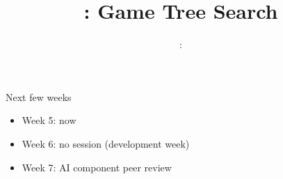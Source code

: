 \usepackage{../../beamerthemeFalmouthGamesAcademy}
\usepackage{multimedia}
\graphicspath{ {../../} }

\usepackage[T1]{fontenc}

\renewcommand{\pounds}{\text{\textsterling}}


\usepackage[normalem]{ulem}
\usepackage{wasysym}

\usepackage[noend]{algpseudocode}
\usepackage{pdfpages}

\usetikzlibrary{arrows,automata}




\title{\sessionnumber: Game Tree Search}
\subtitle{\modulecode: \moduletitle}

\frame{\titlepage} 

\begin{frame}{Next few weeks}
    \begin{itemize}
        \pause\item Week 5: now
        \pause\item Week 6: no session (development week)
        \pause\item Week 7: AI component peer review
    \end{itemize}
\end{frame}









